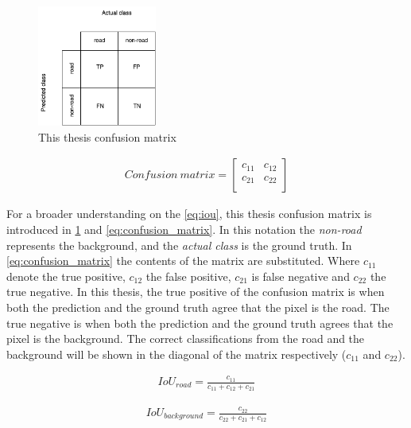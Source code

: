 \documentclass[USenglish]{ifimaster}  %
\begin{document}
\begin{figure}[ht]
    \centering
    \includegraphics[width=0.35\textwidth]{bilder/confusion_matrix.png}
    \caption{This thesis confusion matrix}
    \label{fig:confusion_matrix}
\end{figure}


\begin{equation}\label{eq:confusion_matrix}
\begin{aligned}
Confusion\:matrix =
\begin{bmatrix} 
   c_{11} & c_{12} \\
   c_{21} & c_{22} \\
\end{bmatrix} 
\end{aligned}
\end{equation}

For a broader understanding on the \cref{eq:iou}, this thesis confusion matrix is introduced in \cref{fig:confusion_matrix} and \cref{eq:confusion_matrix}. In this notation the \textit{non-road} represents the background, and the \textit{actual class} is the ground truth. In \cref{eq:confusion_matrix} the contents of the matrix are substituted. Where $c_{11}$ denote the true positive, $c_{12}$ the false positive, $c_{21}$ is false negative and $c_{22}$ the true negative. In this thesis, the true positive of the confusion matrix is when both the prediction and the ground truth agree that the pixel is the road. The true negative is when both the prediction and the ground truth agrees that the pixel is the background. The correct classifications from the road and the background will be shown in the diagonal of the matrix respectively ($c_{11}$ and $c_{22}$).

\begin{equation}\label{eq:iou_1}
\begin{aligned}
IoU_{road} = \frac{c_{11}}{c_{11} + c_{12} + c_{21}}
\end{aligned}
\end{equation}

\begin{equation}\label{eq:iou_2}
\begin{aligned}
IoU_{background} = \frac{c_{22}}{c_{22} + c_{21} + c_{12}}
\end{aligned}
\end{equation}
\end{document}
